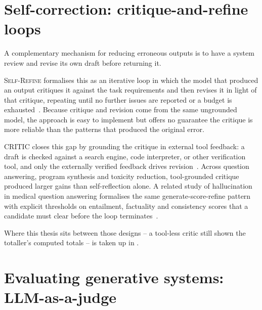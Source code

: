 \section{Self-correction: critique-and-refine loops}
\label{sec:background-self-correction}

A complementary mechanism for reducing erroneous outputs is to have a system review and revise its own draft before returning it.

\textsc{Self-Refine} formalises this as an iterative loop in which the model that produced an output critiques it against the task requirements and then revises it in light of that critique, repeating until no further issues are reported or a budget is exhausted~\cite{madaan2023selfrefine}. Because critique and revision come from the same ungrounded model, the approach is easy to implement but offers no guarantee the critique is more reliable than the patterns that produced the original error.

\textsc{CRITIC} closes this gap by grounding the critique in external tool feedback: a draft is checked against a search engine, code interpreter, or other verification tool, and only the externally verified feedback drives revision~\cite{gou2024critic}. Across question answering, program synthesis and toxicity reduction, tool-grounded critique produced larger gains than self-reflection alone. A related study of hallucination in medical question answering formalises the same generate-score-refine pattern with explicit thresholds on entailment, factuality and consistency scores that a candidate must clear before the loop terminates~\cite{ji2023towards}.

Where this thesis sits between those designs -- a tool-less critic still shown the totaller's computed totals -- is taken up in .

\section{Evaluating generative systems: LLM-as-a-judge}
\label{sec:background-evaluation}

